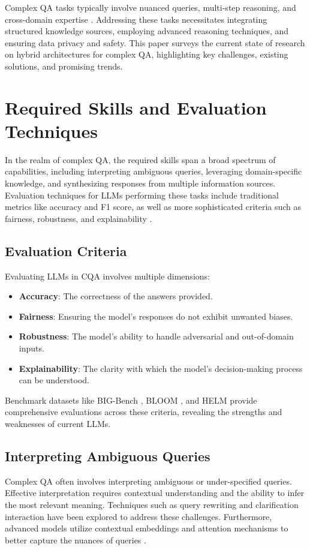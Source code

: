 \documentclass{article}
\begin{document}
Complex QA tasks typically involve nuanced queries, multi-step reasoning, and cross-domain expertise \cite{khashabi2020unifiedqa}. Addressing these tasks necessitates integrating structured knowledge sources, employing advanced reasoning techniques, and ensuring data privacy and safety. This paper surveys the current state of research on hybrid architectures for complex QA, highlighting key challenges, existing solutions, and promising trends.

\section{Required Skills and Evaluation Techniques}
In the realm of complex QA, the required skills span a broad spectrum of capabilities, including interpreting ambiguous queries, leveraging domain-specific knowledge, and synthesizing responses from multiple information sources. Evaluation techniques for LLMs performing these tasks include traditional metrics like accuracy and F1 score, as well as more sophisticated criteria such as fairness, robustness, and explainability \cite{tan2021reliability}.

\subsection{Evaluation Criteria}
Evaluating LLMs in CQA involves multiple dimensions:
\begin{itemize}
    \item \textbf{Accuracy}: The correctness of the answers provided.
    \item \textbf{Fairness}: Ensuring the model's responses do not exhibit unwanted biases.
    \item \textbf{Robustness}: The model's ability to handle adversarial and out-of-domain inputs.
    \item \textbf{Explainability}: The clarity with which the model's decision-making process can be understood.
\end{itemize}

Benchmark datasets like BIG-Bench \cite{srivastava2022beyond}, BLOOM \cite{scao2022bloom}, and HELM \cite{liang2022helm} provide comprehensive evaluations across these criteria, revealing the strengths and weaknesses of current LLMs.

\subsection{Interpreting Ambiguous Queries}
Complex QA often involves interpreting ambiguous or under-specified queries. Effective interpretation requires contextual understanding and the ability to infer the most relevant meaning. Techniques such as query rewriting and clarification interaction \cite{raffel2020exploring} have been explored to address these challenges. Furthermore, advanced models utilize contextual embeddings and attention mechanisms to better capture the nuances of queries \cite{devlin2018bert}.
\end{document}
